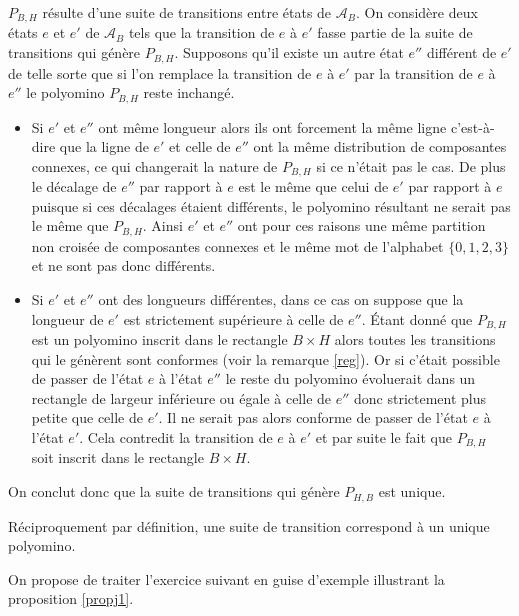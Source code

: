 \begin{Pre}
$P_{B,H}$ résulte d'une suite de transitions entre états de $\mathcal{A}_{B}$. On considère deux états $e$ et $e'$  de $\mathcal{A}_{B}$ tels que la transition de $e$ à $e'$ fasse partie de la suite de transitions qui génère $P_{B,H}$. Supposons qu'il existe un autre état $e''$ différent de $e'$ de telle sorte que si l'on remplace la transition de $e$ à $e'$  par la transition de $e$ à $e''$ le polyomino $P_{B,H}$ reste inchangé. 
\begin{itemize}
\item Si $e'$ et $e''$ ont même longueur alors ils ont forcement la même ligne c'est-à-dire que la ligne de $e'$ et celle de $e''$ ont la même distribution de composantes connexes, ce qui changerait la nature de $P_{B,H}$ si ce n'était pas le cas. De plus le décalage de  $e''$  par rapport à $e$ est le même que celui de $e'$ par rapport à $e$ puisque si ces décalages étaient différents, le  polyomino résultant ne serait pas le même que $P_{B,H}$. Ainsi $e'$ et $e''$ ont pour ces raisons une même partition non croisée de composantes connexes   et le même mot de l'alphabet $\{0,1,2,3\}$ et ne sont pas donc différents.

 \item Si $e'$ et $e''$ ont des longueurs différentes, dans ce cas on suppose que la longueur de $e'$ est strictement supérieure à celle de $e''$. Étant donné que $P_{B,H}$ est un polyomino inscrit dans le rectangle $B\times H$ alors toutes les transitions qui le génèrent sont conformes (voir la remarque \ref{reg}). Or si c'était possible de passer de l'état $e$ à l'état $e''$  le reste du polyomino évoluerait dans un rectangle de largeur inférieure ou égale à celle de $e''$ donc strictement plus petite que celle de $e'$. Il  ne serait pas alors conforme de passer de l'état $e$ à l'état $e'$. Cela contredit la transition de $e$ à $e'$ et par suite le fait que  $P_{B,H}$ soit inscrit dans le rectangle $B\times H$.
\end{itemize}
On conclut donc que la suite de transitions qui génère  $P_{H,B}$ est unique.

Réciproquement par définition, une suite de transition correspond à un unique polyomino.
\end{Pre}
On  propose de traiter l'exercice suivant  en guise d'exemple illustrant la proposition \ref{propj1}. 
